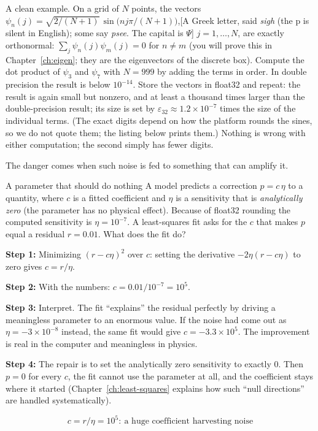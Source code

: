 A clean example. On a grid of $N$ points, the vectors $\psi_n(j)=\sqrt{2/(N+1)}\,\sin\bigl(nj\pi/(N+1)\bigr)$,[A Greek letter, said \emph{sigh} (the p is silent in English); some say \emph{psee}. The capital is $\Psi$] $j=1,\dots,N$, are exactly orthonormal: $\sum_j\psi_n(j)\psi_m(j)=0$ for $n\ne m$ (you will prove this in Chapter~\ref{ch:eigen}; they are the eigenvectors of the discrete box). Compute the dot product of $\psi_3$ and $\psi_7$ with $N=999$ by adding the terms in order. In double precision the result is below $10^{-14}$. Store the vectors in float32 and repeat: the result is again small but nonzero, and at least a thousand times larger than the double-precision result; its size is set by $\varepsilon_{32}\approx1.2\times10^{-7}$ times the size of the individual terms. (The exact digits depend on how the platform rounds the sines, so we do not quote them; the listing below prints them.) Nothing is wrong with either computation; the second simply has fewer digits.

The danger comes when such noise is fed to something that can amplify it.

\begin{sample}{A parameter that should do nothing}
A model predicts a correction $p=c\,\eta$ to a quantity, where $c$ is a fitted coefficient and $\eta$ is a sensitivity that is \emph{analytically zero} (the parameter has no physical effect). Because of float32 rounding the computed sensitivity is $\eta=10^{-7}$. A least-squares fit asks for the $c$ that makes $p$ equal a residual $r=0.01$. What does the fit do?

\textbf{Step 1:} Minimizing $(r-c\eta)^2$ over $c$: setting the derivative $-2\eta(r-c\eta)$ to zero gives $c=r/\eta$.

\textbf{Step 2:} With the numbers: $c=0.01/10^{-7}=10^5$.

\textbf{Step 3:} Interpret. The fit ``explains'' the residual perfectly by driving a meaningless parameter to an enormous value. If the noise had come out as $\eta=-3\times10^{-8}$ instead, the same fit would give $c=-3.3\times10^5$. The improvement is real in the computer and meaningless in physics.

\textbf{Step 4:} The repair is to set the analytically zero sensitivity to exactly $0$. Then $p=0$ for every $c$, the fit cannot use the parameter at all, and the coefficient stays where it started (Chapter~\ref{ch:least-squares} explains how such ``null directions'' are handled systematically).

\[
\boxed{c=r/\eta=10^5:\ \text{a huge coefficient harvesting noise}}
\]
\end{sample}

